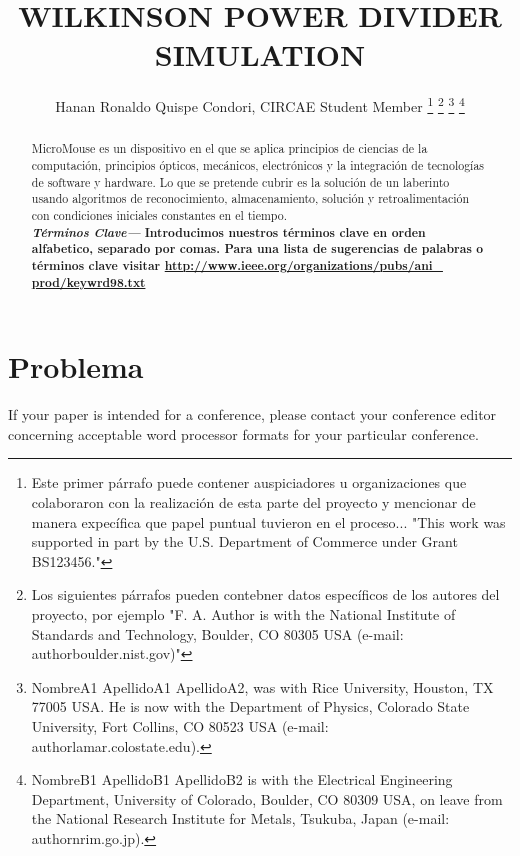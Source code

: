 \documentclass[a4paper]{IEEEtran} %
\providecommand{\keywords}[1]{\textbf{\textit{Términos Clave---}} #1}
\begin{document}
\title{WILKINSON POWER DIVIDER SIMULATION}
\author{Hanan Ronaldo Quispe Condori, CIRCAE Student Member
\thanks{Este primer párrafo puede contener auspiciadores u organizaciones que colaboraron con la realización de esta parte del proyecto y mencionar de manera expecífica que papel puntual tuvieron en el proceso... "This work was supported in part by the U.S. Department of Commerce under Grant BS123456."}
\thanks{Los siguientes párrafos pueden contebner datos específicos de los autores del proyecto, por ejemplo "F. A. Author is with the National Institute of Standards and Technology, Boulder, CO 80305 USA (e-mail: author\@ boulder.nist.gov)"}
\thanks{NombreA1 ApellidoA1 ApellidoA2, was with Rice University, Houston, TX 77005 USA. He is now with the Department of Physics, Colorado State University, Fort Collins, CO 80523 USA (e-mail: author\@ lamar.colostate.edu).}
\thanks{NombreB1 ApellidoB1 ApellidoB2 is with the Electrical Engineering Department, University of Colorado, Boulder, CO 80309 USA, on leave from the National Research Institute for Metals, Tsukuba, Japan (e-mail: author\@ nrim.go.jp).}}

\maketitle


\begin{abstract}
MicroMouse es un dispositivo en el que se aplica principios de ciencias de la computación, principios ópticos, mecánicos, electrónicos y la integración de tecnologías de software y hardware. Lo que se pretende cubrir es la solución de un laberinto usando algoritmos de reconocimiento, almacenamiento, solución y retroalimentación con condiciones iniciales constantes en el tiempo.\\
\keywords{\textbf{Introducimos nuestros términos clave en orden alfabetico, separado por comas. Para una lista de sugerencias de palabras o términos clave visitar \underline{http://www.ieee.org/organizations/pubs/ani\_ prod/keywrd98.txt}}}
\end{abstract}
\section{Problema}
If your paper is intended for a conference, please contact your conference 
editor concerning acceptable word processor formats for your particular 
conference. 
\end{document}

